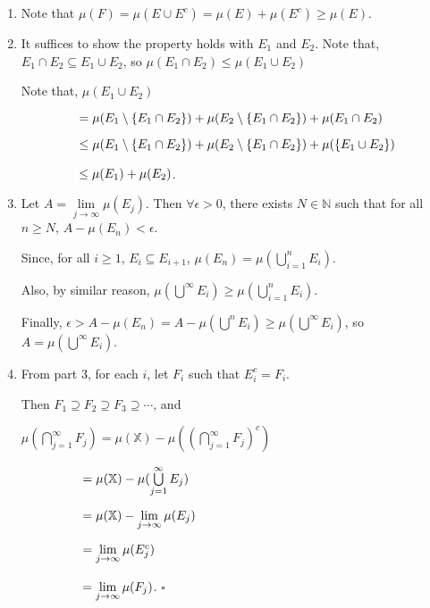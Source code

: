 \documentclass[12pt]{article}
\begin{document}
\begin{enumerate}
    \item Note that $\mu(F) = \mu(E \cup E^c) = \mu(E) + \mu(E^c) \geq \mu(E)$.

    \item It suffices to show the property holds with $E_1$ and $E_2$.
        Note that, $E_1 \cap E_2 \subseteq E_1 \cup E_2$, so $\mu(E_1 \cap E_2) \le \mu(E_1 \cup E_2)$

        Note that, $\mu(E_1 \cup E_2)$

        $\hspace{1.6cm}= \mu(E_1 \setminus \{E_1 \cap E_2\}) + \mu(E_2 \setminus \{E_1 \cap E_2\}) + \mu(E_1 \cap E_2)$

        $\hspace{1.6cm}\le \mu(E_1 \setminus \{E_1 \cap E_2\}) + \mu(E_2 \setminus \{E_1 \cap E_2\}) + \mu(\{E_1 \cup E_2\})$

        $\hspace{1.6cm}\le \mu(E_1) + \mu(E_2)$.

    \item Let $A = \lim\limits_{j\rightarrow\infty}\mu(E_j)$. Then $\forall \epsilon > 0$, there exists $N \in\mathbb{N}$ such that for all $n \geq N$, $A - \mu(E_n) < \epsilon$.

    Since, for all $i \geq 1$, $E_i \subseteq E_{i+1}$, $\mu(E_n) = \mu(\bigcup\limits_{i=1}^{n}E_i)$.

    Also, by similar reason, $\mu(\bigcup\limits^{\infty} E_i) \geq \mu(\bigcup\limits_{i=1}^{n}E_i)$.

    Finally, $\epsilon > A - \mu(E_n) = A - \mu(\bigcup\limits^{n}E_i) \geq \mu(\bigcup\limits^{\infty} E_i)$, so $A = \mu(\bigcup\limits^{\infty} E_i)$.

    \item From part 3, for each $i$, let $F_i$ such that $E_i^c = F_i$.

    Then $F_1\supseteq F_2\supseteq F_3\supseteq\cdots$, and

    $\mu(\bigcap \limits_{j=1}^\infty F_j) = \mu(\mathbb{X}) - \mu((\bigcap \limits_{j=1}^\infty F_j)^c)$

    $\hspace{1.7cm}= \mu(\mathbb{X})-\mu(\bigcup \limits_{j=1}^\infty E_j)$

    $\hspace{1.7cm}= \mu(\mathbb{X}) - \lim\limits_{j\rightarrow\infty}\mu(E_j)$

    $\hspace{1.7cm}= \lim\limits_{j\rightarrow\infty}\mu(E_j^c) $

    $\hspace{1.7cm}= \lim\limits_{j\rightarrow\infty}\mu(F_j)$. $\square$
\end{enumerate}
\end{document}
